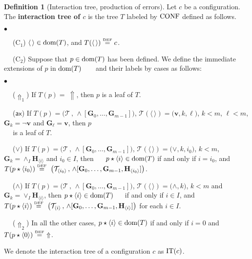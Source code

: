 \documentclass[copyright,creativecommons]{eptcs}
\newcommand{\vv}{\langle}
\newcommand{\ww}{\rangle}
\newcommand{\axi}{\mathsf{ax}}
\newcommand{\eqdef}{\stackrel{\text{\tiny \textnormal{DEF}}}{=}}
\newcommand{\roo}{\vv \, \ww}
\newcommand{\cT}{\mathcal{T}}
\newcommand{\Dis}[1]{\big( #1 \big)}
\newcommand{\arppp}[2]{\textstyle\vee_{#2} \bH_{#1}}
\newcommand{\arnnn}[2]{\textstyle\wedge_{#2} \bH_{#1}}
\newcommand{\bG}{\mathbf{G}}
\newcommand{\bH}{\mathbf{H}}
\newcommand{\bbv}{\mathbf{v}}
\newcommand{\dom}{\ensuremath{\textnormal{dom}}}
\newcommand{\conf}{\textnormal{CONF}}
\newcommand{\CT}{\textnormal{IT}}
\theoremstyle{definition}
\newtheorem{Definition}[theorem]{Definition}
\newcommand{\squishlist}{
 \begin{list}{$\bullet$}
  { \setlength{\itemsep}{0pt}
     \setlength{\parsep}{3pt}
     \setlength{\topsep}{3pt}
     \setlength{\partopsep}{0pt}
     \setlength{\leftmargin}{1em}
     \setlength{\labelwidth}{1.5em}
     \setlength{\labelsep}{0.5em} } }
\newcommand{\squishend}{
  \end{list}  }
\begin{document}
 \begin{Definition}[Interaction tree, production of errors] \label{comptree}
 Let $c$ be a configuration.
The  \textbf{interaction tree of $c$}
is the tree $T$ labeled by $\conf$
 defined as follows.

\squishlist
\item[$\phantom{ab}$ (C$_1$)]  $\roo \in \dom(T)$,  and $T(\roo) \eqdef c$.

\item[$\phantom{ab}$ (C$_2$)]  Suppose that $p \in \dom(T)$ has been
 defined. We define the immediate  extensions of
 $p$ in $\dom(T)$  \linebreak    $\phantom{ab i}$  and their labels by cases as follows:


\squishlist

\item[$\phantom{ab}$ ($\Uparrow_1$)] \hspace{-0.11cm}If $T(p) = \ \Uparrow$, then $p$ is  a leaf of $T$.

\item[$\phantom{ab}$ ($\axi$)] \hspace{-0.07cm}If  $T(p) =  \big( \cT  \, , \, \wedge[\bG_0,\ldots, \bG_{m-1}]    \big)$,
  $\cT(\roo) = \Dis{\bbv, k,\ell}$,  $k <m$, $\ell <m$, $\bG_k = \neg \bbv$ and $\bG_\ell =  \bbv$, then $p$ \\
$\phantom{lii}$ is a leaf of $T$.


\item[$\phantom{ab}$ ($\vee$)] If  $T(p) =  \big( \cT  \, , \, \wedge[\bG_0,\ldots, \bG_{m-1}]    \big)$,
$\cT(\roo) = \Dis{\vee, k,i_0}$, $k < m$, $\bG_k = \arnnn{\vv i \ww}{I}$ and $ i_0 \in I$, then \linebreak
$\phantom{iii}$ $ p \star \vv i \ww \in \dom(T)$ if and only if $i = i_0$,
and $T(p \star \vv i_0 \ww) \eqdef \ \big( \cT_{\vv i_0 \ww}  \, , \, \wedge[\bG_0,\ldots, \bG_{m-1}, \bH_{\vv i_0 \ww}] \big)$.

\item[$\phantom{ab}$ ($\wedge$)] If   $T(p) =  \big( \cT  \, , \, \wedge[\bG_0,\ldots, \bG_{m-1}]    \big)$,
$\cT(\roo)= \Dis{\wedge, k}$,  $k < m$ and $\bG_k = \arppp{\vv i \ww}{I}$, then  $ p \star \vv i \ww \in \dom(T)$ \linebreak
$\phantom{lii}$ if and only if $i \in I$,
and $T(p \star \vv i \ww) \eqdef \ \big( \cT_{\vv i \ww}  \, , \, \wedge[\bG_0,\ldots, \bG_{m-1}, \bH_{\vv i \ww}] \big)$  for each $i \in I$.
\item [$\phantom{ab}$ ($\Uparrow_2$)]  \hspace{-0.20cm} In all the other cases, $ p \star \vv i \ww \in \dom(T)$ if and only if $i = 0$  and
 $T(p \star \vv 0 \ww) \eqdef \ \Uparrow$.
\squishend
\squishend
We denote the interaction tree of a configuration
$c$ as $\CT(c)$.


\end{Definition}
\end{document}
